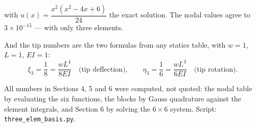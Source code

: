 \documentclass[11pt]{article}
\begin{document}
with $u(x)=\dfrac{x^{2}(x^{2}-4x+6)}{24}$ the exact solution.  The nodal values
agree to $3\times10^{-15}$ --- with only three elements.

\medskip
And the tip numbers are the two formulas from any statics table, with
$w=1$, $L=1$, $EI=1$:
\[
  \xi_{3}=\frac18=\frac{wL^{4}}{8EI}\quad\text{(tip deflection)},
  \qquad
  \eta_{3}=\frac16=\frac{wL^{3}}{6EI}\quad\text{(tip rotation)} .
\]

\vfill
{\footnotesize\color{black!55}All numbers in Sections 4, 5 and 6 were computed,
not quoted: the nodal table by evaluating the six functions, the blocks by Gauss
quadrature against the element integrals, and Section 6 by solving the
$6\times6$ system.  Script: \texttt{three\_elem\_basis.py}.}
\end{document}
